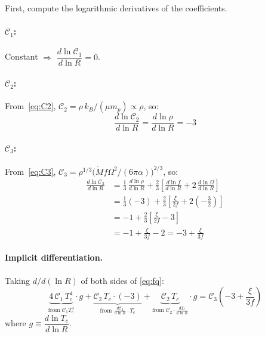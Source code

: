 \documentclass[11pt]{article}
\begin{document}
First, compute the logarithmic derivatives of the coefficients.

\paragraph{$\mathcal{C}_1$:} Constant $\Rightarrow$ $\dfrac{d\ln\mathcal{C}_1}{d\ln R} = 0$.

\paragraph{$\mathcal{C}_2$:} From~\eqref{eq:C2}, $\mathcal{C}_2 = \rho\, k_B/(\mu m_p) \propto \rho$, so:
\begin{equation}
    \frac{d\ln\mathcal{C}_2}{d\ln R} = \frac{d\ln\rho}{d\ln R} = -3
    \label{eq:dlnC2}
\end{equation}

\paragraph{$\mathcal{C}_3$:} From~\eqref{eq:C3}, $\mathcal{C}_3 = \rho^{1/3}\bigl(\dot{M} f \Omega^2/(6\pi\alpha)\bigr)^{2/3}$, so:
\begin{align}
    \frac{d\ln\mathcal{C}_3}{d\ln R}
    &= \frac{1}{3}\,\frac{d\ln\rho}{d\ln R} + \frac{2}{3}\!\left[\frac{d\ln f}{d\ln R} + 2\,\frac{d\ln\Omega}{d\ln R}\right] \nonumber\\
    &= \frac{1}{3}(-3) + \frac{2}{3}\!\left[\frac{\xi}{2f} + 2\!\left(-\frac{3}{2}\right)\right] \nonumber\\
    &= -1 + \frac{2}{3}\!\left[\frac{\xi}{2f} - 3\right] \nonumber\\
    &= -1 + \frac{\xi}{3f} - 2 = -3 + \frac{\xi}{3f}
    \label{eq:dlnC3}
\end{align}

\paragraph{Implicit differentiation.} Taking $d/d(\ln R)$ of both sides of \eqref{eq:fq}:
\begin{equation}
    \underbrace{4\,\mathcal{C}_1\, T_c^4}_{\text{from } \mathcal{C}_1 T_c^4}\cdot g
    + \underbrace{\mathcal{C}_2\, T_c\cdot(-3)}_{\text{from } \frac{d\mathcal{C}_2}{d\ln R}\cdot T_c}
    + \underbrace{\mathcal{C}_2\, T_c}_{\text{from } \mathcal{C}_2\cdot\frac{dT_c}{d\ln R}}\cdot g
    = \mathcal{C}_3\!\left(-3 + \frac{\xi}{3f}\right)
    \label{eq:implicit_full}
\end{equation}
where $g \equiv \dfrac{d\ln T_c}{d\ln R}$.
\end{document}

